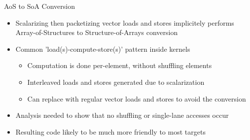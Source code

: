 
\begin{frame}{AoS to SoA Conversion}

\begin{itemize}
    \item Scalarizing then packetizing vector loads and stores implicitely performs Array-of-Structures to Structure-of-Arrays conversion
    \item Common 'load(s)-compute-store(s)' pattern inside kernels
    \begin{itemize}
        \item Computation is done per-element, without shuffling elements
        \item Interleaved loads and stores generated due to scalarization
        \item Can replace with regular vector loads and stores to avoid the conversion
    \end{itemize}
    \item Analysis needed to show that no shuffling or single-lane accesses occur
    \item Resulting code likely to be much more friendly to most targets
\end{itemize}

\end{frame}
